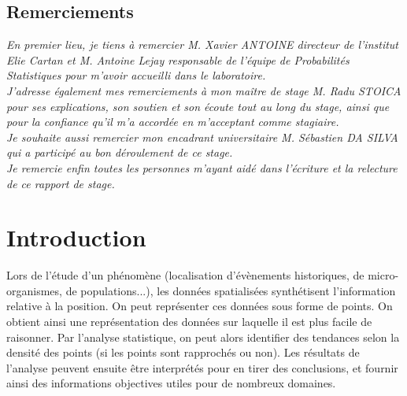 \documentclass[stage2a]{tnreport}
\begin{document}
  
\maketitle
{}


\cleardoublepage

\makesecondtitle

\section*{Remerciements}

{\em
En premier lieu, je tiens à remercier M. Xavier ANTOINE directeur de l'institut Elie Cartan et M. Antoine Lejay responsable de l'équipe de Probabilités Statistiques pour m'avoir accueilli dans le laboratoire.\\

J'adresse également mes remerciements à mon maître de stage M. Radu STOICA pour ses explications, son soutien et son écoute tout au long du stage, ainsi que pour la confiance qu'il m'a accordée en m'acceptant comme stagiaire.\\

Je souhaite aussi remercier mon encadrant universitaire M. Sébastien DA SILVA qui a participé au bon déroulement de ce stage.\\

Je remercie enfin toutes les personnes m'ayant aidé dans l'écriture et la relecture de ce rapport de stage.
}

\cleardoublepage

\renewcommand{\baselinestretch}{0.5}\normalsize
\tableofcontents
\renewcommand{\baselinestretch}{1.0}\normalsize
\cleardoublepage

\setcounter{page}{1}

\chapter{Introduction}


Lors de l'étude d'un phénomène (localisation d'évènements historiques, de micro-organismes, de populations...), les données spatialisées synthétisent l'information relative à la position. On peut représenter ces données sous forme de points. On obtient ainsi une représentation des données sur laquelle il est plus facile de raisonner. Par l'analyse statistique, on peut alors identifier des tendances selon la densité des points (si les points sont rapprochés ou non). Les résultats de l'analyse peuvent ensuite être interprétés pour en tirer des conclusions, et fournir ainsi des informations objectives utiles pour de nombreux domaines.
\end{document}
